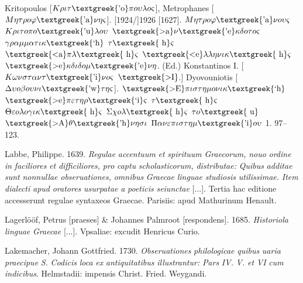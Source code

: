 Kritopoulos [$K\rho \iota \tau \text{\textgreek{'o}}\pi o\upsilon \lambda o\varsigma $], Metrophanes [$M\eta \tau \rho o\varphi \text{\textgreek{'a}}\nu \eta \varsigma $]. [1924/]1926 [1627]. $M\eta \tau \rho o\varphi \text{\textgreek{'a}}\nu o\upsilon \varsigma $ $K\rho \iota \tau o\pi o\text{\textgreek{'u}}\lambda o\upsilon $ $\text{\textgreek{>a}}\nu \text{\textgreek{'e}}\kappa \delta o\tau o\varsigma $ $\gamma \rho \alpha \mu \mu \alpha \tau \iota \kappa \text{\textgreek{`h}}$ $\tau \text{\textgreek{~h}}\varsigma $ $\text{\textgreek{<a}}\pi \lambda \text{\textgreek{~h}}\varsigma $ $\text{\textgreek{<e}}\lambda \lambda \eta \nu \iota \kappa \text{\textgreek{~h}}\varsigma $ $\text{\textgreek{>e}}\kappa \delta \iota \delta o\mu \text{\textgreek{'e}}\nu \eta $. (Ed.) Konstantinos I. [$K\omega \nu \sigma \tau \alpha \nu \tau \text{\textgreek{'i}}\nu o\varsigma $ $\text{\textgreek{>I}}$.] Dyovouniotis [$\Delta \upsilon o\beta o\upsilon \nu \iota \text{\textgreek{'w}}\tau \eta \varsigma $]. \textit{$\text{\textgreek{>E}}\pi \iota \sigma \tau \eta \mu o\nu \iota \kappa \text{\textgreek{`h}}$ $\text{\textgreek{>e}}\pi \varepsilon \tau \eta \rho \text{\textgreek{`i}}\varsigma $ $\tau \text{\textgreek{~h}}\varsigma $ $\Theta \varepsilon o\lambda o\gamma \iota \kappa \text{\textgreek{~h}}\varsigma $ $\Sigma \chi o\lambda \text{\textgreek{~h}}\varsigma $ $\tau o\text{\textgreek{~u}}$ $\text{\textgreek{>A}}\theta \text{\textgreek{'h}}\nu \eta \sigma \iota $ $\Pi \alpha \nu \varepsilon \pi \iota \sigma \tau \eta \mu \text{\textgreek{'i}}o\upsilon $} 1. 97–123.

Labbe, Philippe. 1639. \textit{Regulae} \textit{accentuum} \textit{et} \textit{spirituum} \textit{Graecorum,} \textit{nouo} \textit{ordine} \textit{in} \textit{faciliores} \textit{et} \textit{difficiliores,} \textit{pro} \textit{captu} \textit{scholasticorum,} \textit{distributae:} \textit{Quibus} \textit{additae} \textit{sunt} \textit{nonnullae} \textit{obseruationes,} \textit{omnibus} \textit{Graecae} \textit{linguae} \textit{studiosis} \textit{utilissimae.} \textit{Item} \textit{dialecti} \textit{apud} \textit{oratores} \textit{usurpatae} \textit{a} \textit{poeticis} \textit{seiunctae} [...]. Tertia hac editione accesserunt regulae syntaxeos Graecae. Parisiis: apud Mathurinum Henault.

Lagerlööf, Petrus [praeses] \& Johannes Palmroot [respondens]. 1685. \textit{Historiola} \textit{linguae} \textit{Graecae} [...]. Vpsaliae: excudit Henricus Curio.

Lakemacher, Johann Gottfried. 1730. \textit{Obseruationes} \textit{philologicae} \textit{quibus} \textit{uaria} \textit{praecipue} \textit{S.} \textit{Codicis} \textit{loca} \textit{ex} \textit{antiquitatibus} \textit{illustrantur:} \textit{Pars} \textit{IV.} \textit{V.} \textit{et} \textit{VI} \textit{cum} \textit{indicibus}. Helmstadii: impensis Christ. Fried. Weygandi.

